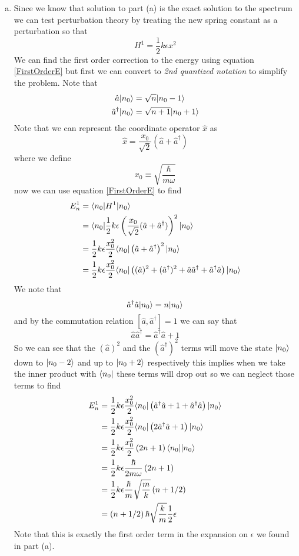 \documentclass[11pt]{article}
\numberwithin{equation}{section}
\begin{document}
\begin{enumerate}[(a)]
\item
Since we know that solution to part (a) is the exact solution to the spectrum we can test perturbation theory by treating the new spring constant as a perturbation so that
$$H^1 = \frac{1}{2}k\epsilon x^2$$
We can find the first order correction to the energy using equation \ref{FirstOrderE} but first we can convert to \emph{2nd quantized notation} to simplify the problem. Note that
\begin{align*}
\hat{a}|{n_0}\rangle &= \sqrt{n}|{n_0-1}\rangle\\
\hat{a}^{\dagger}|{n_0}\rangle &= \sqrt{n+1}|{n_0+1}\rangle
\end{align*}
Note that we can represent the coordinate operator $\hat{x}$ as 
$$\hat{x} = \frac{x_0}{\sqrt{2}}(\hat{a}+\hat{a}^{\dagger})$$
where we define
$$x_0\equiv\sqrt{\frac{\hbar}{m\omega}}$$
now we can use equation \ref{FirstOrderE} to find
\begin{align*}
E_n^1 &= \langle{n_0}|H^1|{n_0}\rangle\\
&= \langle{n_0}|\frac{1}{2}k\epsilon\left(\frac{x_0}{\sqrt{2}}(\hat{a}+\hat{a}^{\dagger})\right)^2|{n_0}\rangle\\
&= \frac{1}{2}k\epsilon\frac{x_0^2}{2}\langle{n_0}|\left(\hat{a}+\hat{a}^{\dagger}\right)^2|{n_0}\rangle\\
&= \frac{1}{2}k\epsilon\frac{x_0^2}{2}\langle{n_0}|\left((\hat{a})^2+(\hat{a}^{\dagger})^2+\hat{a}\hat{a}^{\dagger} + \hat{a}^{\dagger}\hat{a}\right)|{n_0}\rangle
\end{align*}
We note that 
$$\hat{a}^{\dagger}\hat{a}|{n_0}\rangle = n|{n_0}\rangle$$
and by the commutation relation $[\hat{a},\hat{a}^{\dagger}] = 1$ we can say that
$$\hat{a}\hat{a}^{\dagger} = \hat{a}^{\dagger}\hat{a} + 1$$ 
So we can see that the $(\hat{a})^2$ and the $(\hat{a}^{\dagger})^2$ terms will move the state $|{n_0}\rangle$ down to $|{n_0-2}\rangle$ and up to $|{n_0+2}\rangle$ respectively this implies when we take the inner product with $\langle{n_0}|$ these terms will drop out so we can neglect those terms to find
\begin{align*}
E_n^1 &= \frac{1}{2}k\epsilon\frac{x_0^2}{2}\langle{n_0}|\left(\hat{a}^{\dagger}\hat{a} + 1 + \hat{a}^{\dagger}\hat{a}\right)|{n_0}\rangle\\
&= \frac{1}{2}k\epsilon\frac{x_0^2}{2}\langle{n_0}|\left(2\hat{a}^{\dagger}\hat{a} + 1\right)|{n_0}\rangle\\
&= \frac{1}{2}k\epsilon\frac{x_0^2}{2}\left(2n + 1\right)\langle{n_0}||{n_0}\rangle\\
&= \frac{1}{2}k\epsilon\frac{\hbar}{2m\omega}\left(2n + 1\right)\\
&= \frac{1}{2}k\epsilon\frac{\hbar}{m}\sqrt{\frac{m}{k}}\left(n + 1/2\right)\\
&= \left(n + 1/2\right)\hbar\sqrt{\frac{k}{m}}\frac{1}{2}\epsilon
\end{align*}
Note that this is exactly the first order term in the expansion on $\epsilon$ we found in part (a).
\end{enumerate}
\end{document}
